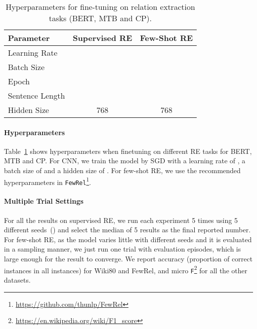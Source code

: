 \documentclass[11pt,a4paper]{article}
\begin{document}
\begin{table}[t]
    \small
    \centering
    \begin{tabular}{l|cc}
        \toprule
        \textbf{Parameter} & \textbf{Supervised RE} &  \textbf{Few-Shot RE} \\
        \midrule 
        Learning Rate &  & \\
        Batch Size &  &  \\
        Epoch &  &  \\
        Sentence Length &  & \\
        Hidden Size & 768 & 768 \\
        \bottomrule
    \end{tabular}
    \caption{Hyperparameters for fine-tuning on relation extraction tasks (BERT, MTB and CP).}
    \label{tab:task_params}
\end{table}

\paragraph{Hyperparameters} 



Table~\ref{tab:task_params} shows hyperparameters when finetuning on different RE tasks for BERT, MTB and CP. For CNN, we train the model by SGD with a learning rate of , a batch size of  and a hidden size of .
For few-shot RE, we use the recommended hyperparameters in \texttt{FewRel}\footnote{\url{https://github.com/thunlp/FewRel}}.






\paragraph{Multiple Trial Settings}  For all the results on supervised RE, we run each experiment 5 times using 5 different seeds~() and select the median of 5 results as the final reported number. For few-shot RE, as the model varies little with different seeds and it is evaluated in a sampling manner, we just run one trial with  evaluation episodes, which is large enough for the result to converge. We report accuracy (proportion of correct instances in all instances) for Wiki80 and FewRel, and micro \texttt{F}\footnote{\url{https://en.wikipedia.org/wiki/F1_score}} for all the other datasets.










\end{document}
